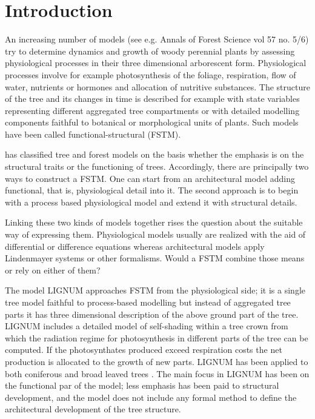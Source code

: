 \section{Introduction}
An increasing number of models  (see e.g. Annals of Forest Science vol
57 no.  5/6) try to determine  dynamics and growth  of woody perennial
plants by assessing physiological processes in their three dimensional
arborescent  form.    Physiological  processes  involve   for  example
photosynthesis of  the foliage, respiration, flow  of water, nutrients
or hormones and allocation  of nutritive substances.  The structure of
the tree and  its changes in time is described  for example with state
variables representing different  aggregated tree compartments or with
detailed modelling  components faithful to  botanical or morphological
units of  plants. Such  models have been  called functional-structural
(FSTM).

\citet{kurth:94b} has classified tree and forest models  on the basis
whether the emphasis is on the structural traits or the functioning of
trees.   Accordingly, there are  principally two  ways to  construct a
FSTM.   One can  start from  an architectural  model \citep{jaeger:92,
kurth:94} adding  functional, that  is, physiological detail  into it.
The second  approach is  to begin with  a process  based physiological
model \citep{makela:86, landsberg:86,  sievanen:93} and extend it with
structural details.

Linking these  two kinds of  models together rises the  question about
the suitable way of  expressing them. Physiological models usually are
realized  with  the  aid   of  differential  or  difference  equations
\citep{landsberg:86}  whereas architectural  models  apply Lindenmayer
systems  \citep{kurth:99,pp:90}  or  other  formalisms. Would  a  FSTM
combine those means or rely on either of them?

The model LIGNUM  approaches FSTM from the physiological  side; it is a
single  tree  model  \citep{perttunen:96}  faithful  to  process-based
modelling  \citep[see  e.g.][]{nikinmaa:92, sievanen:93,  makela:97-1}
but  instead  of  aggregated  tree  parts  it  has  three  dimensional
description of the  above ground part of the  tree.  LIGNUM includes a
detailed    model    of    self-shading    within   a    tree    crown
\citep{perttunen:96, perttunen:01} from which the radiation regime for
photosynthesis in different parts of the tree can be computed.  If the
photosynthates produced exceed respiration costs the net production is
allocated to the growth of new  parts. LIGNUM has been applied to both
coniferous   \citep{perttunen:96,lo:99}   and   broad   leaved   trees
\citep{perttunen:01}. The main focus in LIGNUM has been on the
functional par of the model; less emphasis has been paid to structural
development,  and the  model does  not  include any  formal method  to
define the architectural development of the tree structure.

